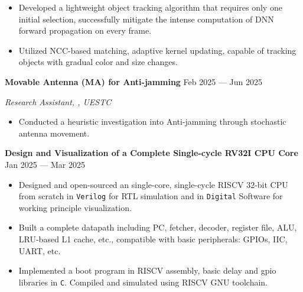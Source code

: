 \documentclass[a4paper,11pt]{article}
\newcommand{\MYhref}[3][black]{\href{#2}{\color{#1}{#3}}}%
\begin{document}
\begin{itemize}
    \setlength\itemsep{-0.5em}
    \item Developed a lightweight object tracking algorithm that requires only one initial selection, successfully mitigate the intense computation of DNN forward propagation on every frame.
    \item Utilized NCC-based matching, adaptive kernel updating, capable of tracking objects with gradual color and size changes.
\end{itemize}

\textbf{Movable Antenna (MA) for Anti-jamming} \hfill Feb 2025 --- Jun 2025

\vspace{-0.5em} \begin{small} \textit{Research Assistant, \MYhref{https://scholar.google.com.sg/citations?user=JtHltIoAAAAJ&hl=en-EN}{Professor Weidong Mei}, UESTC} \end{small} \vspace{-0.5em}

\begin{itemize}
    \setlength\itemsep{-0.5em}
    \item Conducted a heuristic investigation into Anti-jamming through stochastic antenna movement.
\end{itemize}





\textbf{Design and Visualization of a Complete Single-cycle RV32I CPU Core} \hfill Jan 2025 --- Mar 2025

\begin{itemize}
    \setlength\itemsep{-0.5em}
    \item Designed and open-sourced an single-core, single-cycle RISCV 32-bit CPU from scratch in \texttt{Verilog} for RTL simulation and in \texttt{Digital} Software for working principle visualization. 
    \item Built a complete datapath including PC, fetcher, decoder, register file, ALU, LRU-based L1 cache, etc., compatible with basic peripherals: GPIOs, IIC, UART, etc.
    \item Implemented a boot program in RISCV assembly, basic delay and gpio libraries in \texttt{C}. Compiled and simulated using RISCV GNU toolchain.
\end{itemize}
\end{document}
